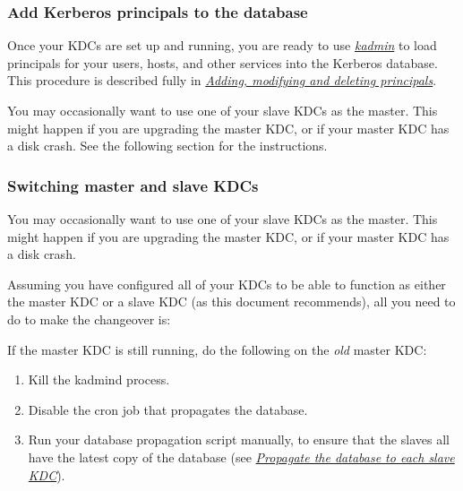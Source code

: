 \documentclass[letterpaper,10pt,english]{sphinxmanual}
\begin{document}
\subsubsection{Add Kerberos principals to the database}
\label{admin/install_kdc:add-kerberos-principals-to-the-database}
Once your KDCs are set up and running, you are ready to use
{\hyperref[admin/admin_commands/kadmin_local:kadmin-1]{\emph{kadmin}}} to load principals for your users, hosts, and other
services into the Kerberos database.  This procedure is described
fully in {\hyperref[admin/database:add-mod-del-princs]{\emph{Adding, modifying and deleting principals}}}.

You may occasionally want to use one of your slave KDCs as the master.
This might happen if you are upgrading the master KDC, or if your
master KDC has a disk crash.  See the following section for the
instructions.


\subsubsection{Switching master and slave KDCs}
\label{admin/install_kdc:switching-master-and-slave-kdcs}\label{admin/install_kdc:switch-master-slave}
You may occasionally want to use one of your slave KDCs as the master.
This might happen if you are upgrading the master KDC, or if your
master KDC has a disk crash.

Assuming you have configured all of your KDCs to be able to function
as either the master KDC or a slave KDC (as this document recommends),
all you need to do to make the changeover is:

If the master KDC is still running, do the following on the \emph{old}
master KDC:
\begin{enumerate}
\item {} 
Kill the kadmind process.

\item {} 
Disable the cron job that propagates the database.

\item {} 
Run your database propagation script manually, to ensure that the
slaves all have the latest copy of the database (see
{\hyperref[admin/install_kdc:kprop-to-slaves]{\emph{Propagate the database to each slave KDC}}}).

\end{enumerate}
\end{document}
